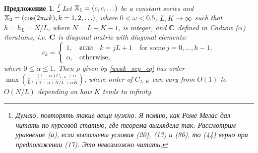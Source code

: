 \documentclass[12pt,a4paper,fleqn,leqno]{article}
\newtheorem{proposition}{Предложение}
\begin{document}
\begin{proposition}
\label{prop:separ1} \footnote{Думаю, повторять такие вещи нужно. Я помню, как Роме Мелас дал читать по курсовой статью, где теорема выглядела так: Рассмотрим уравнение (а), если выполнены условия (20), (13) и (86), то (44) верно при предположении (17). Это невозможно читать.}
Let $\mathbb{X}_1 = (c, c, \ldots)$ be a constant series and $\mathbb{X}_2 = (\cos(2 \pi \omega k), k = 1, 2, \ldots)$, where $0<\omega <0.5$, $L,K\rightarrow \infty$ such that $h = h_L = N/L$, where $N=L+K-1$, is integer, and $\mathbf{C}$ defined in Cadzow ($\alpha$) iterations, i.e.  $\mathbf{C}$ is diagonal matrix with diagonal elements:
\begin{equation*}
c_k = \begin{cases}
1, & \text{если} \quad k = jL+1 \quad \text{for some} \ j = 0, \ldots, h-1,\\
\alpha, & \text{otherwise},
\end{cases}
\end{equation*}
where $0 \le \alpha \le 1$. Then $\rho$ given by \eqref{weak_sep_eq} has order $\max(\frac{1}{L}, \frac{(1-\alpha)C_{L,K}+\alpha}{(1-\alpha)N/L+\alpha K})$, where order of $C_{L,K}$
can vary from $O(1)$ to $O(N/L)$ depending on how $K$ tends to infinity.
\end{proposition}
\end{document}
